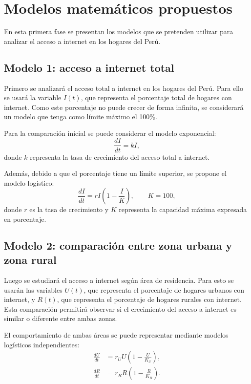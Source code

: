 \section{Modelos matemáticos propuestos}

En esta primera fase se presentan los modelos que se pretenden utilizar para analizar el acceso a internet en los hogares del Perú.

\subsection{Modelo 1: acceso a internet total}

Primero se analizará el acceso total a internet en los hogares del Perú. Para ello se usará la variable $I(t)$, que representa el porcentaje total de hogares con internet. Como este porcentaje no puede crecer de forma infinita, se considerará un modelo que tenga como límite máximo el 100\%.

Para la comparación inicial se puede considerar el modelo exponencial:
\begin{equation}
    \frac{dI}{dt}=kI,
\end{equation}
donde $k$ representa la tasa de crecimiento del acceso total a internet.

Además, debido a que el porcentaje tiene un límite superior, se propone el modelo logístico:
\begin{equation}
    \frac{dI}{dt}=rI\left(1-\frac{I}{K}\right), \qquad K=100,
\end{equation}
donde $r$ es la tasa de crecimiento y $K$ representa la capacidad máxima expresada en porcentaje.

\subsection{Modelo 2: comparación entre zona urbana y zona rural}

Luego se estudiará el acceso a internet según área de residencia. Para esto se usarán las variables $U(t)$, que representa el porcentaje de hogares urbanos con internet, y $R(t)$, que representa el porcentaje de hogares rurales con internet. Esta comparación permitirá observar si el crecimiento del acceso a internet es similar o diferente entre ambas zonas.

El comportamiento de ambas áreas se puede representar mediante modelos logísticos independientes:
\begin{align}
    \frac{dU}{dt} &= r_U U\left(1-\frac{U}{K_U}\right), \\
    \frac{dR}{dt} &= r_R R\left(1-\frac{R}{K_R}\right).
\end{align}

